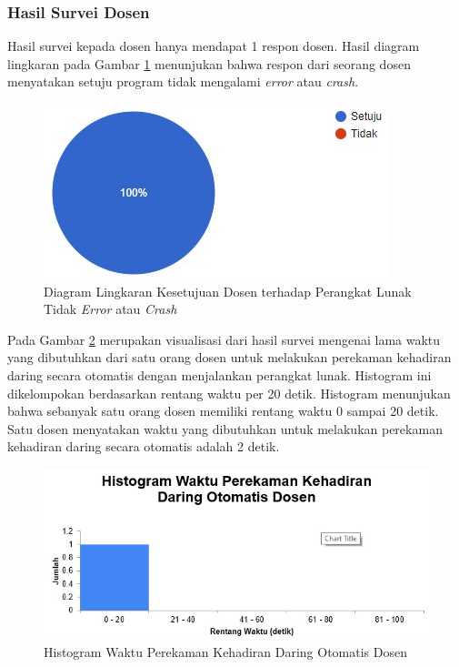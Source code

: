 \subsubsection{Hasil Survei Dosen}
Hasil survei kepada dosen hanya mendapat 1 respon dosen. Hasil diagram lingkaran pada Gambar \ref{fig:noerrorDosen} menunjukan bahwa respon dari seorang dosen menyatakan setuju program tidak mengalami \textit{error} atau \textit{crash}.
\begin{figure}[H]
	\centering
	\includegraphics[scale=0.7]{Gambar/diagramLingkaran.jpg}
	\caption{Diagram Lingkaran Kesetujuan Dosen terhadap Perangkat Lunak Tidak \textit{Error} atau \textit{Crash}} 
	\label{fig:noerrorDosen}
\end{figure}
\newpage
Pada Gambar \ref{fig:olDosen} merupakan visualisasi dari hasil survei mengenai lama waktu yang dibutuhkan dari satu orang dosen untuk melakukan perekaman kehadiran daring secara otomatis dengan menjalankan perangkat lunak. Histogram ini dikelompokan berdasarkan rentang waktu per 20 detik. Histogram menunjukan bahwa sebanyak satu orang dosen memiliki rentang waktu 0 sampai 20 detik. Satu dosen menyatakan waktu yang dibutuhkan untuk melakukan perekaman kehadiran daring secara otomatis adalah 2 detik.
\begin{figure}[H]
	\centering
	\includegraphics[scale=0.75]{Gambar/HistogramDaringOtomatisDosen.jpg}
	\caption{Histogram Waktu Perekaman Kehadiran Daring Otomatis Dosen}
	\label{fig:olDosen}
\end{figure}
